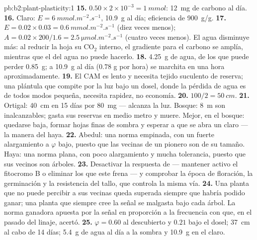 \begin{solution}{pb:b2:plant-plasticity:1}
\textbf{15.} $0.50\times 2\times 10^{-3} = \qty{1}{mmol}$: \qty{12}{mg}
de carbono al día.
\textbf{16.} Claro: $E = \qty{6}{mmol.m^{-2}.s^{-1}}$, \qty{10.9}{g} al
día; eficiencia de \qty{900}{g/g}.
\textbf{17.} $E = 0.02\times 0.03 = \qty{0.6}{mmol.m^{-2}.s^{-1}}$
(diez veces menos); $A = 0.02\times 200/1.6 = \qty{2.5}{\micro
mol.m^{-2}.s^{-1}}$ (cuatro veces menos). El agua disminuye más: al
reducir la hoja su $\mathrm{CO_2}$ interno, el gradiente para el carbono
se amplía, mientras que el del agua no puede hacerlo.
\textbf{18.} \qty{4.25}{g} de agua, de los que puede perder \qty{0.85}{g};
a \qty{10.9}{g} al día ($0.78$ g por hora) se marchita en una hora
aproximadamente.
\textbf{19.} El CAM es lento y necesita tejido suculento de reserva; una
plántula que compite por la luz bajo un dosel, donde la pérdida de agua es
de todos modos pequeña, necesita rapidez, no economía.
\textbf{20.} $100/2 = \qty{50}{cm}$.
\textbf{21.} Ortigal: \qty{40}{cm} en 15 días por \qty{80}{mg} --- alcanza
la luz. Bosque: \qty{8}{m} son inalcanzables; gasta sus reservas en medio
metro y muere. Mejor, en el bosque: quedarse baja, formar hojas finas de
sombra y esperar a que se abra un claro --- la manera del haya.
\textbf{22.} Abedul: una norma empinada, con un fuerte alargamiento a
$\varphi$ bajo, puesto que las vecinas de un pionero son de su tamaño.
Haya: una norma plana, con poco alargamiento y mucha tolerancia, puesto
que sus vecinos son árboles.
\textbf{23.} Desactivar la respuesta de  ---
mantener activo el fitocromo B o eliminar los 
que este frena --- y comprobar la época de floración, la germinación y la
resistencia del tallo, que controla la misma vía.
\textbf{24.} Una planta que no puede percibir a sus vecinas queda superada
siempre que habría podido ganar; una planta que siempre cree la señal se
malgasta bajo cada árbol. La norma ganadora apuesta por la señal en
proporción a la frecuencia con que, en el pasado del linaje, acertó.
\textbf{25.} $\varphi = 0.60$ al descubierto y $0.21$ bajo el dosel;
\qty{37}{cm} al cabo de 14 días; \qty{5.4}{g} de agua al día a la sombra y
\qty{10.9}{g} en el claro.
\end{solution}
